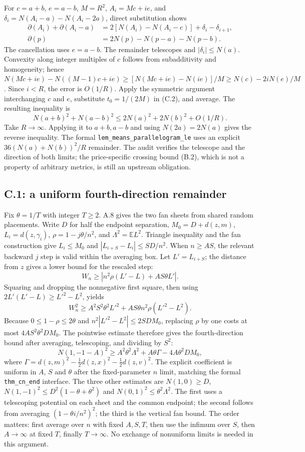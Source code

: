 \documentclass[11pt,letterpaper]{article}
\begin{document}
For $c=a+b$, $e=a-b$, $M=R^2$, $A_i=Mc+ie$, and $\delta_i=N(A_i-a)-N(A_i-2a)$, direct substitution shows
\begin{align*}
\partial(A_i)+\partial(A_i-a)&=2[N(A_i)-N(A_i-c)]+\delta_i-\delta_{i+1},\\
\partial(p)&=2N(p)-N(p-a)-N(p-b).
\end{align*}
The cancellation uses $e=a-b$. The remainder telescopes and $|\delta_i|\le N(a)$. Convexity along integer multiples of $c$ follows from subadditivity and homogeneity; hence $N(Mc+ie)-N((M-1)c+ie)\ge [N(Mc+ie)-N(ie)]/M\ge N(c)-2iN(e)/M$. Since $i<R$, the error is $O(1/R)$. Apply the symmetric argument interchanging $c$ and $e$, substitute $t_0=1/(2M)$ in (C.2), and average. The resulting inequality is
\[
N(a+b)^2+N(a-b)^2\le 2N(a)^2+2N(b)^2+O(1/R).
\]
Take $R\to\infty$. Applying it to $a+b,a-b$ and using $N(2a)=2N(a)$ gives the reverse inequality. The formal \texttt{lem\_means\_parallelogram\_le} uses an explicit $36(N(a)+N(b))^2/R$ remainder. The audit verifies the telescope and the direction of both limits; the price-specific crossing bound (B.2), which is not a property of arbitrary metrics, is still an upstream obligation.

\subsection{C.1: a uniform fourth-direction remainder}
Fix $\theta=1/T$ with integer $T\ge2$. A.8 gives the two fan sheets from shared random placements. Write $D$ for half the endpoint separation, $M_0=D+d(z,m)$, $L_i=d(z,\gamma_i)$, $\rho=1-j\theta/n^2$, and $\Lambda^2=\mathbb E L^2$. Triangle inequality and the fan construction give $L_i\le M_0$ and $|L_{i+S}-L_i|\le SD/n^2$. When $n\ge AS$, the relevant backward $j$ step is valid within the averaging box. Let $L'=L_{i+S}$; the distance from $z$ gives a lower bound for the rescaled step:
\[
 W_n\ge|n^2\rho(L'-L)+AS\theta L'|.
\]
Squaring and dropping the nonnegative first square, then using $2L'(L'-L)\ge L'^2-L^2$, yields
\[
W_n^2\ge A^2S^2\theta^2L'^2+AS\theta n^2\rho(L'^2-L^2).
\]
Because $0\le1-\rho\le2\theta$ and $n^2|L'^2-L^2|\le2SDM_0$, replacing $\rho$ by one costs at most $4AS^2\theta^2DM_0$. The pointwise estimate therefore gives the fourth-direction bound after averaging, telescoping, and dividing by $S^2$:
\[
N(1,-1-A)^2\ge A^2\theta^2\Lambda^2+A\theta\Gamma-4A\theta^2DM_0,
\]
where $\Gamma=d(z,m)^2-\tfrac12 d(z,x)^2-\tfrac12d(z,v)^2$. The explicit coefficient is uniform in $A$, $S$ and $\theta$ after the fixed-parameter $n$ limit, matching the formal \texttt{thm\_cn\_end} interface. The three other estimates are $N(1,0)\ge D$, $N(1,-1)^2\le D^2(1-\theta+\theta^2)$ and $N(0,1)^2\le\theta^2\Lambda^2$. The first uses a telescoping potential on each sheet and the common endpoint; the second follows from averaging $(1-\theta i/n^2)^2$; the third is the vertical fan bound. The order matters: first average over $n$ with fixed $A,S,T$, then use the infimum over $S$, then $A\to\infty$ at fixed $T$, finally $T\to\infty$. No exchange of nonuniform limits is needed in this argument.
\end{document}

